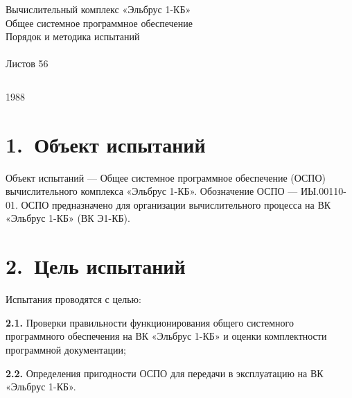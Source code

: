 \documentclass[11pt,a4paper]{article}
\begin{document}
\begin{titlepage}\small
\noindent\begin{minipage}[t]{0.45\linewidth}\end{minipage}\hfill\begin{minipage}[t]{0.45\linewidth}\raggedleft \end{minipage}
\vspace*{\fill}\begin{center}
{\large Вычислительный комплекс «Эльбрус 1-КБ»}\\[0.6em]
{\large Общее системное программное обеспечение}\\[0.6em]
{\large Порядок и методика испытаний}\\[0.6em]
\vspace{1em}{\large\bfseries ИЫ.00110-01 51 01}\\[0.4em]
Листов 56\end{center}\vspace*{\fill}
\begin{flushright}\begin{tabular}{r}\end{tabular}\end{flushright}
\begin{center}1988\end{center}\end{titlepage}
\tableofcontents\clearpage
\section*{1.~Объект испытаний}
Объект испытаний --- Общее системное программное обеспечение (ОСПО) вычислительного комплекса «Эльбрус 1-КБ». Обозначение ОСПО --- ИЫ.00110-01. ОСПО предназначено для организации вычислительного процесса на ВК «Эльбрус 1-КБ» (ВК Э1-КБ).

\section*{2.~Цель испытаний}
Испытания проводятся с целью:

\par\textbf{2.1.} Проверки правильности функционирования общего системного программного обеспечения на ВК «Эльбрус 1-КБ» и оценки комплектности программной документации;\par
\par\textbf{2.2.} Определения пригодности ОСПО для передачи в эксплуатацию на ВК «Эльбрус 1-КБ».\par
\end{document}
